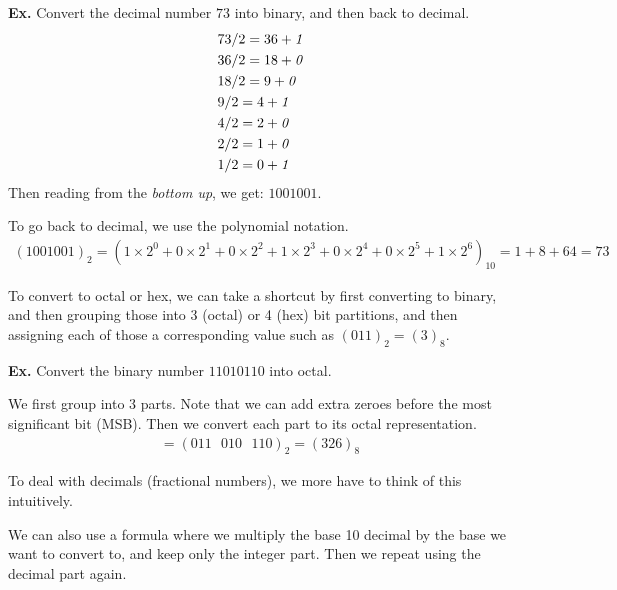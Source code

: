 \documentclass[12pt,letterpaper]{article} \usepackage{amsmath} \usepackage{graphicx}  \usepackage{longtable}  \usepackage{amssymb}
\begin{document}
        \begin{mdframed}
            \textbf{Ex. } Convert the decimal number $73$ into binary, and then back to decimal. 
            \begin{align*}
                &73/2 = 36 +\emph{1}\\
                & 36 / 2 = 18 + \emph{0}\\
                &18/2=9+\emph{0}\\
                &9/2=4+\emph{1}\\
                &4/2=2+\emph{0}\\
                &2/2=1+\emph{0}\\
                &1/2=0+\emph{1}
            \end{align*}
            Then reading from the \emph{bottom up}, we get: $1001001$.

            To go back to decimal, we use the polynomial notation.
            \begin{align*}
                (1001001)_2 = (1\times 2^0 + 0\times 2^1 + 0\times 2^2 + 1\times 2^3 + 0\times 2^4 + 0\times 2^5 + 1\times 2^6)_{10} = 1+8+64 = 73
            \end{align*}
        \end{mdframed}

        To convert to octal or hex, we can take a shortcut by first converting to binary, and then grouping those into 3 (octal) or 4 (hex) bit partitions, and then assigning each of those a corresponding value such as $(011)_2=(3)_8$.

        \begin{mdframed}
            \textbf{Ex. } Convert the binary number $11010110$ into octal. 

            We first group into 3 parts. Note that we can add extra zeroes before the most significant bit (MSB). Then we convert each part to its octal representation. 
            \begin{align*}
                = (011 \text{ } 010\text{ }110)_2 = (326)_8
            \end{align*}
        \end{mdframed}

        To deal with decimals (fractional numbers), we more have to think of this intuitively. 

        We can also use a formula where we multiply the base 10 decimal by the base we want to convert to, and keep only the integer part. Then we repeat using the decimal part again.
\end{document}
